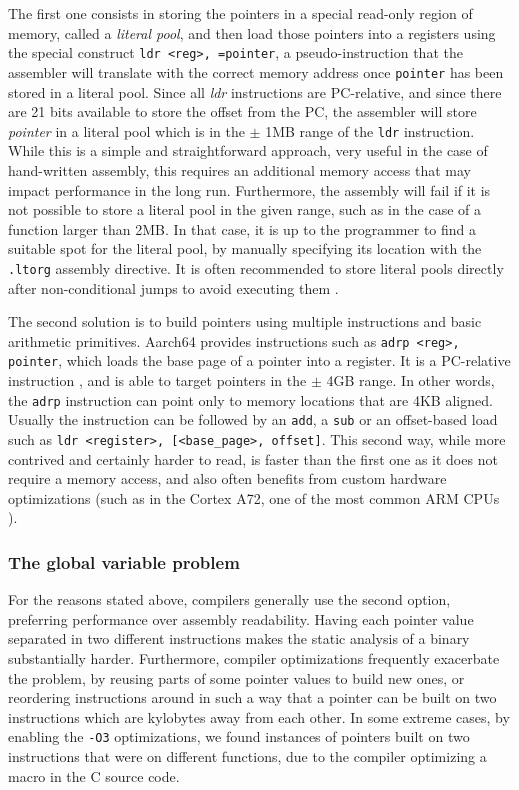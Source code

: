 \documentclass[a4paper,11pt,oneside]{report}
\begin{document}
The first one consists in storing the pointers in a special read-only region of 
memory, called a \emph{literal pool}, and then load those pointers into a 
registers using the special construct \texttt{ldr <reg>, =pointer}, a 
pseudo-instruction that the assembler will translate with the correct memory 
address once \texttt{pointer} has been stored in a literal pool.  Since all 
\emph{ldr} instructions are PC-relative, and since there are 21 bits available 
to store the offset from the PC, the assembler will store \emph{pointer} in a 
literal pool which is in the $\pm$ 1MB range of the \texttt{ldr} instruction.  
While this is a simple and straightforward approach, very useful in the case of 
hand-written assembly, this requires an additional memory access that may 
impact performance in the long run. Furthermore, the assembly will fail if it 
is not possible to store a literal pool in the given range, such as in the case 
of a function larger than 2MB. In that case, it is up to the programmer to find 
a suitable spot for the literal pool, by manually specifying its location with 
the \texttt{.ltorg} assembly directive. It is often recommended to store 
literal pools directly after non-conditional jumps to avoid executing them 
\cite{literalpools}.

The second solution is to build pointers using multiple instructions and basic 
arithmetic primitives. Aarch64 provides instructions such as \texttt{adrp 
<reg>, pointer}, which loads the base page of a pointer into a register. It is 
a PC-relative instruction , and is able to target pointers in the $\pm$ 4GB 
range. In other words, the \texttt{adrp} instruction can point only to memory 
locations that are 4KB aligned. Usually the instruction can be followed by an 
\texttt{add}, a \texttt{sub} or an offset-based load such as \texttt{ldr 
<register>, [<base\_page>, offset]}. This second way, while more contrived and 
certainly harder to read, is faster than the first one as it does not require a 
memory access, and also often benefits from custom hardware optimizations (such 
as in the Cortex A72, one of the most common ARM CPUs 
\cite{pointeroptimizations}). 

\subsubsection{The global variable problem}
For the reasons stated above, compilers generally use the second option, 
preferring performance over assembly readability. Having each pointer value 
separated in two different instructions makes the static analysis of a binary 
substantially harder. Furthermore, compiler optimizations frequently exacerbate 
the problem, by reusing parts of some pointer values to build new ones, or 
reordering instructions around in such a way that a pointer can be built on two 
instructions which are kylobytes away from each other. In some extreme cases, 
by enabling the \texttt{-O3} optimizations, we found instances of pointers 
built on two instructions that were on different functions, due to the compiler 
optimizing a macro in the C source code. 
\end{document}
